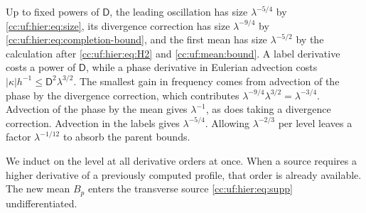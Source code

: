 Up to fixed powers of $\mathsf D$, the leading oscillation has size
$\lambda^{-5/4}$ by \eqref{cc:uf:hier:eq:size}, its divergence correction
has size $\lambda^{-9/4}$ by \eqref{cc:uf:hier:eq:completion-bound},
and the first mean has size $\lambda^{-5/2}$ by the calculation after
\eqref{cc:uf:hier:eq:H2} and \eqref{cc:uf:mean:bound}.
A label derivative costs a power of $\mathsf D$, while a phase derivative
in Eulerian advection costs $|\kappa|h^{-1}\le\mathsf D^2\lambda^{3/2}$.
The smallest gain in frequency comes from advection of the phase by the divergence
correction, which contributes $\lambda^{-9/4}\lambda^{3/2}=\lambda^{-3/4}$.
Advection of the phase by the mean gives $\lambda^{-1}$,
as does taking a divergence correction. Advection in the labels gives
$\lambda^{-5/4}$. Allowing $\lambda^{-2/3}$ per level leaves a factor
$\lambda^{-1/12}$ to absorb the parent bounds.

We induct on the level at all derivative orders at once. When a source
requires a higher derivative of a previously computed profile, that
order is already available. The new mean $B_p$ enters the transverse
source \eqref{cc:uf:hier:eq:supp} undifferentiated.


